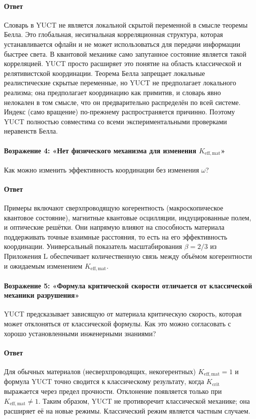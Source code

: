 \documentclass[12pt,a4paper]{article}
\newcommand{\betaf}{\beta}
\newcommand{\Kcrit}{K_{\mathrm{crit}}}
\begin{document}
	\paragraph{Ответ}
	Словарь в YUCT не является локальной скрытой переменной в смысле теоремы Белла. Это глобальная, несигнальная корреляционная структура, которая устанавливается офлайн и не может использоваться для передачи информации быстрее света. В квантовой механике само запутанное состояние является такой корреляцией. YUCT просто расширяет это понятие на область классической и релятивистской координации. Теорема Белла запрещает локальные реалистические скрытые переменные, но YUCT не предполагает локального реализма; она предполагает координацию как примитив, и словарь явно нелокален в том смысле, что он предварительно распределён по всей системе. Индекс (само вращение) по-прежнему распространяется причинно. Поэтому YUCT полностью совместима со всеми экспериментальными проверками неравенств Белла.
	
	\paragraph{Возражение 4: «Нет физического механизма для изменения \(K_{\mathrm{eff,mat}}\)»}
	Как можно изменить эффективность координации без изменения \(\omega\)?
	
	\paragraph{Ответ}
	Примеры включают сверхпроводящую когерентность (макроскопическое квантовое состояние), магнитные квантовые осцилляции, индуцированные полем, и оптические решётки. Они напрямую влияют на способность материала поддерживать точные взаимные расстояния, то есть на его эффективность координации. Универсальный показатель масштабирования \(\betaf = 2/3\) из Приложения L обеспечивает количественную связь между объёмом когерентности и ожидаемым изменением \(K_{\mathrm{eff,mat}}\).
	
	\paragraph{Возражение 5: «Формула критической скорости отличается от классической механики разрушения»}
	YUCT предсказывает зависящую от материала критическую скорость, которая может отклоняться от классической формулы. Как это можно согласовать с хорошо установленными инженерными знаниями?
	
	\paragraph{Ответ}
	Для обычных материалов (несверхпроводящих, некогерентных) \(K_{\mathrm{eff,mat}} = 1\) и формула YUCT точно сводится к классическому результату, когда \(\Kcrit\) выражается через предел прочности. Отклонение появляется только при \(K_{\mathrm{eff,mat}} \neq 1\). Таким образом, YUCT не противоречит классической механике; она расширяет её на новые режимы. Классический режим является частным случаем.
	
\end{document}
